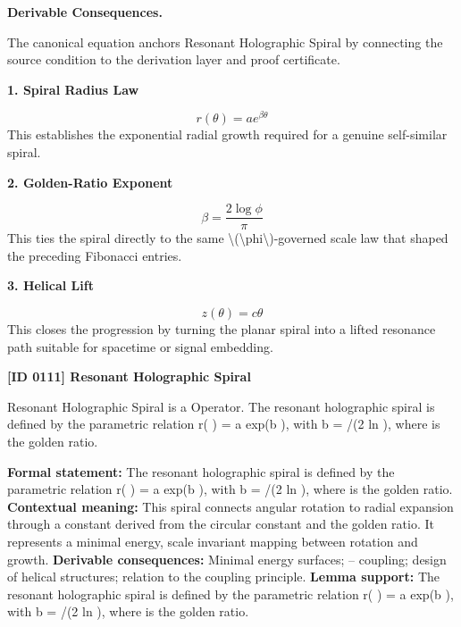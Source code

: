\par\vspace{0.35em}
\noindent\textbf{Derivable Consequences.}\quad
\begingroup
\footnotesize
\raggedright
The canonical equation anchors Resonant Holographic Spiral by connecting the source condition to the derivation layer and proof certificate.
\par\endgroup

\noindent\textbf{1. Spiral Radius Law}\par
\[
r(\theta)=a e^{\beta \theta}
\]
\noindent This establishes the exponential radial growth required for a genuine self-similar spiral.\par
\noindent\textbf{2. Golden-Ratio Exponent}\par
\[
\beta = \frac{2\log \phi}{\pi}
\]
\noindent This ties the spiral directly to the same \textbackslash{}(\textbackslash{}phi\textbackslash{})-governed scale law that shaped the preceding Fibonacci entries.\par
\noindent\textbf{3. Helical Lift}\par
\[
z(\theta)=c\theta
\]
\noindent This closes the progression by turning the planar spiral into a lifted resonance path suitable for spacetime or signal embedding.\par

\clearpage
\noindent\textbf{[ID 0111] Resonant Holographic Spiral}\par
\vspace{0.35em}
\begingroup\small
{}
Resonant Holographic Spiral is a Operator. The resonant holographic spiral is defined by the parametric relation r( ) = a exp(b  ), with b =  /(2 ln  ), where   is the golden ratio.

\begingroup\footnotesize\setlength{\emergencystretch}{3em}\sloppy
\textbf{Formal statement:} The resonant holographic spiral is defined by the parametric relation r( ) = a exp(b  ), with b =  /(2 ln  ), where   is the golden ratio.
\textbf{Contextual meaning:} This spiral connects angular rotation to radial expansion through a constant derived from the circular constant   and the golden ratio. It represents a minimal energy, scale invariant mapping between rotation and growth.
\textbf{Derivable consequences:} Minimal energy surfaces;  --  coupling; design of helical structures; relation to the coupling principle.
\textbf{Lemma support:} The resonant holographic spiral is defined by the parametric relation r( ) = a exp(b  ), with b =  /(2 ln  ), where   is the golden ratio.\par
\endgroup


